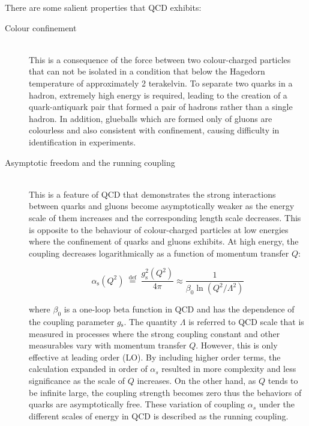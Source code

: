 \documentclass[UTF8,12pt]{ctexart}
\numberwithin{equation}{section}
\begin{document}
There are some salient properties that QCD exhibits:
\begin{description}
\item[Colour confinement] \mbox{} \\
	This is a consequence of the force between two colour-charged particles that can not be isolated in a condition that below the Hagedorn temperature of approximately 2 terakelvin. To separate two quarks in a hadron, extremely high energy is required, leading to the creation of a quark-antiquark pair that formed a pair of hadrons rather than a single hadron. In addition, glueballs which are formed only of gluons are colourless and also consistent with confinement, causing difficulty in identification in experiments. 
	
	
	

\item[Asymptotic freedom and the running coupling] \mbox{} \\
	This is a feature of QCD that demonstrates the strong interactions between quarks and gluons become asymptotically weaker as the energy scale of them increases and the corresponding length scale decreases. This is opposite to the behaviour of colour-charged particles at low energies where the confinement of quarks and gluons exhibits. At high energy, the coupling decreases logarithmically as a function of momentum transfer $Q$:

		\begin{equation}
		\alpha_{\mathrm{s}}\left(Q^{2}\right) \stackrel{\text { def }}{=} \frac{g_{\mathrm{s}}^{2}\left(Q^{2}\right)}{4 \pi} \approx \frac{1}{\beta_{0} \ln \left(Q^{2} / \Lambda^{2}\right)}
		\end{equation}
		
where $\beta_{0}$ is a one-loop beta function in QCD and has the dependence of the coupling parameter $g$$_\mathrm{s}$. The quantity $\Lambda$ is referred to QCD scale that is measured in processes where the strong coupling constant and other measurables vary with momentum transfer $Q$.
However, this is only effective at leading order (LO). By including higher order terms, the calculation expanded in order of $\alpha_{s}$ resulted in more complexity and less significance as the scale of $Q$ increases. On the other hand, as $Q$ tends to be infinite large, the coupling strength becomes zero thus the behaviors of quarks are asymptotically free. These variation of coupling $\alpha_{s}$ under the different scales of energy in QCD is described as the running coupling.



	
\end{description}
\end{document}
